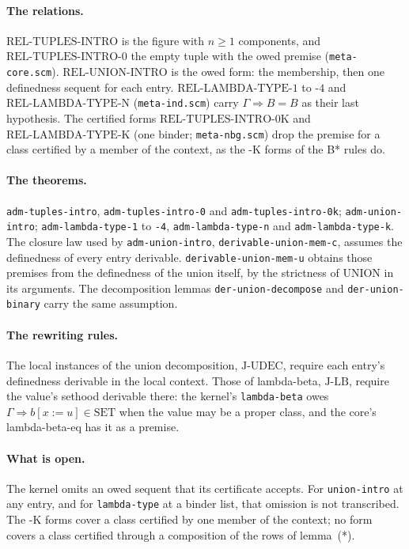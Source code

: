 \paragraph{The relations.}
$\mathrm{REL\text{-}TUPLES\text{-}INTRO}$ is the figure with $n \geq 1$
components, and $\mathrm{REL\text{-}TUPLES\text{-}INTRO\text{-}0}$ the
empty tuple with the owed premise (\texttt{meta-core.scm}).
$\mathrm{REL\text{-}UNION\text{-}INTRO}$ is the owed form: the
membership, then one definedness sequent for each entry.
$\mathrm{REL\text{-}LAMBDA\text{-}TYPE\text{-}1}$ to
$\text{-}4$ and $\mathrm{REL\text{-}LAMBDA\text{-}TYPE\text{-}N}$
(\texttt{meta-ind.scm}) carry $\Gamma \Longrightarrow B = B$ as their last
hypothesis.  The certified forms
$\mathrm{REL\text{-}TUPLES\text{-}INTRO\text{-}0K}$ and
$\mathrm{REL\text{-}LAMBDA\text{-}TYPE\text{-}K}$ (one binder;
\texttt{meta-nbg.scm}) drop the premise for a class certified by a
member of the context, as the -K forms of the B* rules do.

\paragraph{The theorems.}  \texttt{adm-tuples-intro},
\texttt{adm-tuples-intro-0} and \texttt{adm-tuples-intro-0k};
\texttt{adm-union-intro}; \texttt{adm-lambda-type-1} to \texttt{-4},
\texttt{adm-lambda-type-n} and \texttt{adm-lambda-type-k}.  The closure
law used by \texttt{adm-union-intro}, \texttt{derivable-union-mem-c},
assumes the definedness of every entry derivable.
\texttt{derivable-union-mem-u} obtains those premises from the
definedness of the union itself, by the strictness of $\mathrm{UNION}$
in its arguments.  The decomposition lemmas \texttt{der-union-decompose}
and \texttt{der-union-binary} carry the same assumption.

\paragraph{The rewriting rules.}  The local instances of the union
decomposition, $\mathrm{J\text{-}UDEC}$, require each entry's definedness
derivable in the local context.  Those of lambda-beta,
$\mathrm{J\text{-}LB}$, require the value's sethood derivable there: the
kernel's \texttt{lambda-beta} owes $\Gamma \Longrightarrow b[x:=u] \in
\mathrm{SET}$ when the value may be a proper class, and the core's
lambda-beta-eq has it as a premise.

\paragraph{What is open.}  The kernel omits an owed sequent that its
certificate accepts.  For \texttt{union-intro} at any entry, and for
\texttt{lambda-type} at a binder list, that omission is not
transcribed.  The -K forms cover a class certified by one member of the
context; no form covers a class certified through a composition of the
rows of lemma~(*).

